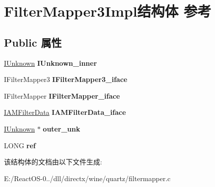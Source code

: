 \hypertarget{struct_filter_mapper3_impl}{}\section{Filter\+Mapper3\+Impl结构体 参考}
\label{struct_filter_mapper3_impl}
\subsection*{Public 属性}
\begin{DoxyCompactItemize}
\item 
\mbox{\label{struct_filter_mapper3_impl_a4e649b1f8f835279192db6d815dc20f1}} 
\hyperlink{interface_i_unknown}{I\+Unknown} {\bfseries I\+Unknown\+\_\+inner}
\item 
\mbox{\label{struct_filter_mapper3_impl_a1abfaae4f41313d310e50cdb00515145}} 
I\+Filter\+Mapper3 {\bfseries I\+Filter\+Mapper3\+\_\+iface}
\item 
\mbox{\label{struct_filter_mapper3_impl_a986c91f0699a449a474f14710b7e0af6}} 
I\+Filter\+Mapper {\bfseries I\+Filter\+Mapper\+\_\+iface}
\item 
\mbox{\label{struct_filter_mapper3_impl_ad2f0a97e7ed3df2677dfaad2b8960ac8}} 
\hyperlink{interface_i_a_m_filter_data}{I\+A\+M\+Filter\+Data} {\bfseries I\+A\+M\+Filter\+Data\+\_\+iface}
\item 
\mbox{\label{struct_filter_mapper3_impl_a319c356b2c25b92029a58e5ca8aa8fc6}} 
\hyperlink{interface_i_unknown}{I\+Unknown} $\ast$ {\bfseries outer\+\_\+unk}
\item 
\mbox{\label{struct_filter_mapper3_impl_a896e55d0e442cc1eb8bbc3d457f8af17}} 
L\+O\+NG {\bfseries ref}
\end{DoxyCompactItemize}


该结构体的文档由以下文件生成\+:\begin{DoxyCompactItemize}
\item 
E\+:/\+React\+O\+S-\/0../dll/directx/wine/quartz/filtermapper.\+c\end{DoxyCompactItemize}
